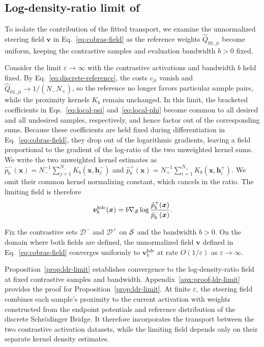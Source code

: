 \subsection{Log-density-ratio limit of \Cobras}
\label{subsec:reduction}

To isolate the contribution of the fitted transport, we examine the unnormalized steering field $\boldsymbol{v}$ in Eq.~\eqref{eq:cobras-field} as the reference weights $\widehat{Q}_{01,ji}$ become uniform, keeping the contrastive samples and evaluation bandwidth $b>0$ fixed.

Consider the limit $\varepsilon\to\infty$ with the contrastive activations and bandwidth $b$ held fixed. By Eq.~\eqref{eq:discrete-reference}, the costs $c_{ji}$ vanish and $\widehat{Q}_{01,ji}\to 1/(N_-N_+)$, so the reference no longer favors particular sample pairs, while the proximity kernels $K_b$ remain unchanged. In this limit, the bracketed coefficients in Eqs.~\eqref{eq:local-psi} and~\eqref{eq:local-phi} become common to all desired and all undesired samples, respectively, and hence factor out of the corresponding sums. Because these coefficients are held fixed during differentiation in Eq.~\eqref{eq:cobras-field}, they drop out of the logarithmic gradients, leaving a field proportional to the gradient of the log-ratio of the two unweighted kernel sums.
We write the two unweighted kernel estimates as $\hat{p}_b^-(\boldsymbol{x})=N_-^{-1}\sum_{j=1}^{N_-}K_b(\boldsymbol{x},\boldsymbol{h}_j^-)$ and $\hat{p}_b^+(\boldsymbol{x})=N_+^{-1}\sum_{i=1}^{N_+}K_b(\boldsymbol{x},\boldsymbol{h}_i^+)$. We omit their common kernel normalizing constant, which cancels in the ratio. The limiting field is therefore
\[
\displaystyle
\boldsymbol{v}_b^{\mathrm{kde}}(\boldsymbol{x})
=
b\nabla_{\mathcal{S}}\log\frac{\hat{p}_b^+(\boldsymbol{x})}{\hat{p}_b^-(\boldsymbol{x})}.
\]

\begin{proposition}
\label{prop:ldr-limit}
Fix the contrastive sets $\mathcal{D}^-$ and $\mathcal{D}^+$ on $\mathcal{S}$ and the bandwidth $b>0$. On the domain where both fields are defined, the unnormalized field $\boldsymbol{v}$ defined in Eq.~\eqref{eq:cobras-field} converges uniformly to $\boldsymbol{v}_b^{\mathrm{kde}}$ at rate $O(1/\varepsilon)$ as $\varepsilon\to\infty$.
\end{proposition}

Proposition~\ref{prop:ldr-limit} establishes convergence to the log-density-ratio field at fixed contrastive samples and bandwidth. Appendix~\ref{apx:proof-ldr-limit} provides the proof for Proposition~\ref{prop:ldr-limit}. At finite $\varepsilon$, the steering field combines each sample's proximity to the current activation with weights constructed from the endpoint potentials and reference distribution of the discrete Schr\"{o}dinger Bridge. It therefore incorporates the transport between the two contrastive activation datasets, while the limiting field depends only on their separate kernel density estimates.

